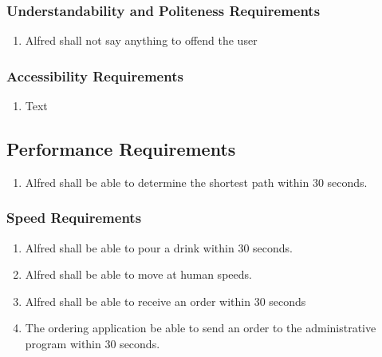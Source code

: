 \documentclass [11pt]{article}
\begin{document}
\subsubsection{Understandability and Politeness Requirements}
	\begin{enumerate}[label=\textbf{(\roman*)}]
		\item Alfred shall not say anything to offend the user 
	\end{enumerate}

\subsubsection{Accessibility Requirements }
	\begin{enumerate}[label=\textbf{(\roman*)}]
		\item Text
	\end{enumerate}
 
\subsection{Performance Requirements}
	\begin{enumerate}[label=\textbf{(\roman*)}]
	\item Alfred shall be able to determine the shortest path within 30 seconds.
		
	\end{enumerate}
\subsubsection{Speed Requirements }
	\begin{enumerate}[label=\textbf{(\roman*)}]
		\item Alfred shall be able to pour a drink within 30 seconds.
		\item Alfred shall be able to move at human speeds.
		\item Alfred shall be able to receive an order within 30 seconds
		\item The ordering application be able to send an order to the administrative program within 30 seconds.
	\end{enumerate}
\end{document}
